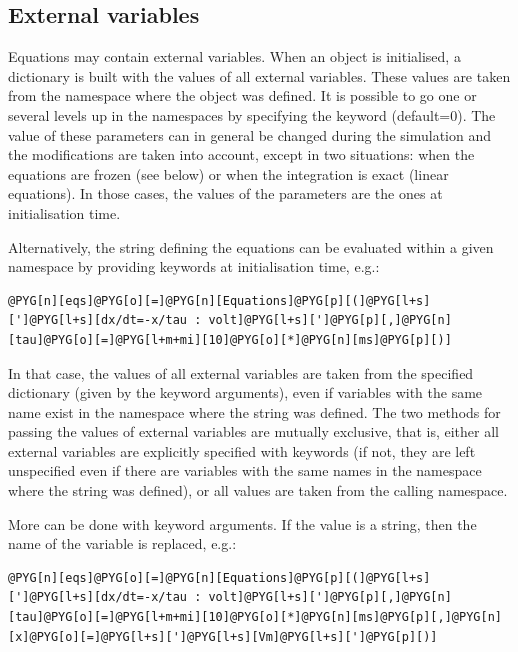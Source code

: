 \documentclass[letterpaper,10pt,english]{manual}
\begin{document}
\hypertarget{index-6}{}\subsection{External variables}

Equations may contain external variables. When an \hyperlink{brian.Equations}{} object is initialised,
a dictionary is built with the values of all external variables. These values are taken
from the namespace where the \hyperlink{brian.Equations}{} object was defined. It is possible to go one or
several levels up in the namespaces by specifying the keyword  (default=0).
The value of these parameters can in general be changed during the simulation and the
modifications are taken into account, except in two situations: when the equations are
frozen (see below) or when the integration is exact (linear equations). In those cases,
the values of the parameters are the ones at initialisation time.

Alternatively, the string defining the equations can be evaluated within a given namespace
by providing keywords at initialisation time, e.g.:

\begin{Verbatim}[commandchars=@\[\]]
@PYG[n][eqs]@PYG[o][=]@PYG[n][Equations]@PYG[p][(]@PYG[l+s][']@PYG[l+s][dx/dt=-x/tau : volt]@PYG[l+s][']@PYG[p][,]@PYG[n][tau]@PYG[o][=]@PYG[l+m+mi][10]@PYG[o][*]@PYG[n][ms]@PYG[p][)]
\end{Verbatim}

In that case, the values of all external variables are taken from the specified
dictionary (given by the keyword arguments), even if variables with the same name
exist in the namespace where the string was defined. The two methods for passing the
values of external variables are mutually exclusive, that is, either all external variables
are explicitly specified with keywords (if not, they are left unspecified even if there
are variables with the same names in the namespace where the string was defined), or all
values are taken from the calling namespace.

More can be done with keyword arguments. If the value is a string, then the name of the
variable is replaced, e.g.:

\begin{Verbatim}[commandchars=@\[\]]
@PYG[n][eqs]@PYG[o][=]@PYG[n][Equations]@PYG[p][(]@PYG[l+s][']@PYG[l+s][dx/dt=-x/tau : volt]@PYG[l+s][']@PYG[p][,]@PYG[n][tau]@PYG[o][=]@PYG[l+m+mi][10]@PYG[o][*]@PYG[n][ms]@PYG[p][,]@PYG[n][x]@PYG[o][=]@PYG[l+s][']@PYG[l+s][Vm]@PYG[l+s][']@PYG[p][)]
\end{Verbatim}
\end{document}
